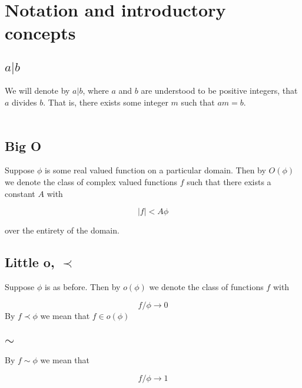 \section{Notation and introductory concepts}

\subsection{$a|b$}

We will denote by $a|b$, where $a$ and $b$ are understood to be positive integers, that $a$ divides $b$. That is, 
there exists some integer $m$ such that $am = b$. \\ \\

\subsection{Big O}

\noi
Suppose $\phi$ is some real valued function on a particular domain. Then by $O(\phi)$ we denote the class of complex valued 
functions $f$ such that there exists a constant $A$ with

\begin{equation*}
    |f| < A\phi
\end{equation*}

\noi
over the entirety of the domain.

\subsection{Little o, $\prec$}
Suppose $\phi$ is as before. Then by $o(\phi)$ we denote the class of functions $f$ with

\begin{equation*}
    f/\phi \to 0
\end{equation*}
\noi
By $f \prec \phi$ we mean that $f \in o(\phi)$

\subsection{$\sim$}
By $f \sim \phi$ we mean that

\begin{equation*}
    f/\phi \to 1
\end{equation*}